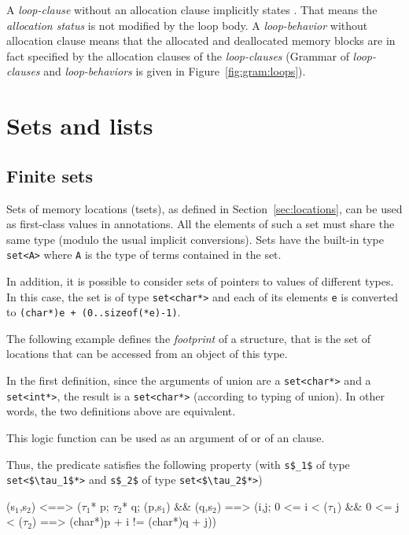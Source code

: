 A {\sl loop-clause} without an allocation clause implicitly states \Loop \allocates \nothing.
That means the {\sl allocation status} is not modified by the loop body.
A {\sl loop-behavior} without allocation clause means that  
the allocated and deallocated memory blocks are in fact specified by the allocation clauses
of the {\sl loop-clauses}
(Grammar of {\sl loop-clauses} and {\sl loop-behaviors} is given in Figure~\ref{fig:gram:loops}).

\section{Sets and lists}

\subsection{Finite sets}\label{sec:sets}
Sets of memory locations (tsets), as defined in Section~\ref{sec:locations},
can be used as first-class values in
annotations. All the elements of such a set must share the same type
(modulo the usual implicit conversions).
Sets have the built-in type \lstinline|set<A>|
where \lstinline|A| is the type of terms contained in the set.

In addition, it is possible to consider sets of pointers to values of
different types. In this case, the set is of type
\lstinline|set<char*>| and
each of its elements \lstinline|e| is converted to
\lstinline|(char*)e + (0..sizeof(*e)-1)|.

\begin{example}
  The following example defines the \emph{footprint} of a
  structure, that is the set of locations that can be accessed from an
  object of this type.


  In the first definition, since the arguments of union are a
  \lstinline|set<char*>| and a \lstinline|set<int*>|,
  the result is a \lstinline|set<char*>| (according to typing of union). In
  other words, the two definitions above are equivalent.

  This logic function can be used as an argument of \separated or of an
  \assigns clause.
\end{example}

Thus, the \separated predicate satisfies the following property (with
\lstinline|s$_1$| of type \lstinline|set<$\tau_1$*>| and \lstinline|s$_2$| of type
\lstinline|set<$\tau_2$*>|)
\begin{listing}{1}
\separated(s$_1$,s$_2$) <==>
  (\forall $\tau_1$* p; \forall $\tau_2$* q;
     \subset(p,s$_1$) && \subset(q,s$_2$) ==>
       (\forall \integer i,j;
         0 <= i < \sizeof($\tau_1$) && 0 <= j < \sizeof($\tau_2$) ==>
           (char*)p + i != (char*)q + j))
\end{listing}

